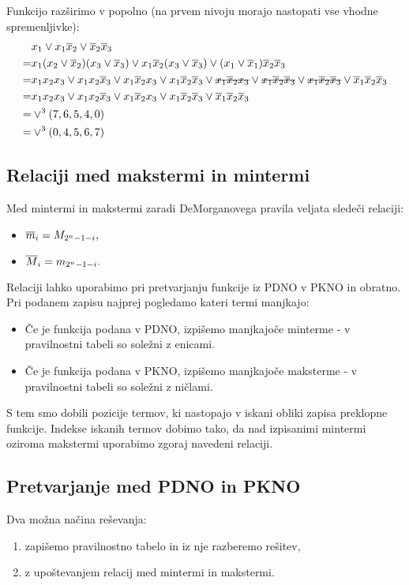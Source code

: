 \begin{resitev}
Funkcijo razširimo v popolno (na prvem nivoju morajo nastopati vse vhodne spremenljivke):
\begin{align*}
&x_1 \vee x_1 \ol x_2 \vee \ol x_2 \ol x_3 \\
= & x_1(x_2 \vee \ol x_2)(x_3 \vee \ol x_3) \vee x_1 \ol x_2 (x_3 \vee \ol x_3) \vee (x_1 \vee \ol x_1)\ol x_2 \ol x_3 \\
= & x_1 x_2 x_3 \vee x_1 x_2 \ol x_3 \vee x_1 \ol x_2 x_3 \vee x_1 \ol x_2 \ol x_3 \vee \hsout{x_1 \ol x_2 x_3} \vee \hsout{x_1 \ol x_2 \ol x_3} \vee \hsout{x_1 \ol x_2 \ol x_3} \vee \ol x_1 \ol x_2 \ol x_3\\
= & x_1 x_2 x_3 \vee x_1 x_2 \ol x_3 \vee x_1 \ol x_2 x_3 \vee x_1 \ol x_2 \ol x_3 \vee \ol x_1 \ol x_2 \ol x_3 \\
= & \vee^3(7,6,5,4,0) \\
= & \vee^3(0,4,5,6,7) \\
\end{align*}

\end{resitev}

\subsection{Relaciji med makstermi in mintermi}
Med mintermi in makstermi zaradi DeMorganovega pravila veljata sledeči relaciji: 
\begin{itemize}
\item $\overline m_i = M_{2^n-1-i},$ 
\item $\overline M_i = m_{2^n-1-i}.$
\end{itemize}

Relaciji lahko uporabimo pri pretvarjanju funkcije iz PDNO v PKNO in obratno. Pri podanem zapisu najprej pogledamo kateri termi manjkajo:
\begin{itemize}
\item Če je funkcija podana v PDNO, izpišemo manjkajoče minterme - v pravilnostni tabeli so soležni z enicami.
\item Če je funkcija podana v PKNO, izpišemo manjkajoče maksterme - v pravilnostni tabeli so soležni z ničlami.
\end{itemize}
S tem smo dobili pozicije termov, ki nastopajo v iskani obliki zapisa preklopne funkcije. Indekse iskanih termov dobimo tako, da nad izpisanimi mintermi oziroma makstermi uporabimo zgoraj navedeni relaciji.

\subsection{Pretvarjanje med PDNO in PKNO}
Dva možna načina reševanja:
\begin{enumerate}
\item zapišemo pravilnostno tabelo in iz nje razberemo rešitev,
\item z upoštevanjem relacij med mintermi in makstermi.
\end{enumerate}

